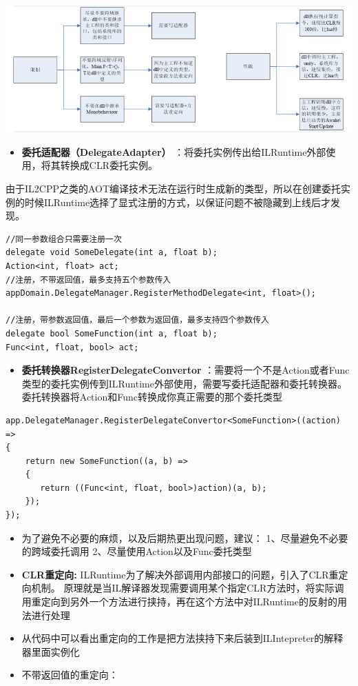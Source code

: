 \documentclass[9pt, b5paper]{article}
\begin{document}
\includegraphics[width=.9\linewidth]{./pic/readme_20220926_095555.png}
\begin{itemize}
\item \textbf{委托适配器（DelegateAdapter）} ：将委托实例传出给ILRuntime外部使用，将其转换成CLR委托实例。
\end{itemize}
由于IL2CPP之类的AOT编译技术无法在运行时生成新的类型，所以在创建委托实例的时候ILRuntime选择了显式注册的方式，以保证问题不被隐藏到上线后才发现。
\begin{verbatim}
//同一参数组合只需要注册一次
delegate void SomeDelegate(int a, float b);
Action<int, float> act;
//注册，不带返回值，最多支持五个参数传入
appDomain.DelegateManager.RegisterMethodDelegate<int, float>();

//注册，带参数返回值，最后一个参数为返回值，最多支持四个参数传入
delegate bool SomeFunction(int a, float b);
Func<int, float, bool> act;
\end{verbatim}
\begin{itemize}
\item \textbf{委托转换器RegisterDelegateConvertor} ：需要将一个不是Action或者Func类型的委托实例传到ILRuntime外部使用，需要写委托适配器和委托转换器。委托转换器将Action和Func转换成你真正需要的那个委托类型
\end{itemize}
\begin{verbatim}
app.DelegateManager.RegisterDelegateConvertor<SomeFunction>((action) =>
{
    return new SomeFunction((a, b) =>
    {
       return ((Func<int, float, bool>)action)(a, b);
    });
});
\end{verbatim}
\begin{itemize}
\item 为了避免不必要的麻烦，以及后期热更出现问题，建议： 1、尽量避免不必要的跨域委托调用 2、尽量使用Action以及Func委托类型
\item \textbf{CLR重定向:} ILRuntime为了解决外部调用内部接口的问题，引入了CLR重定向机制。 原理就是当IL解译器发现需要调用某个指定CLR方法时，将实际调用重定向到另外一个方法进行挟持，再在这个方法中对ILRuntime的反射的用法进行处理
\item 从代码中可以看出重定向的工作是把方法挟持下来后装到ILIntepreter的解释器里面实例化
\item 不带返回值的重定向：
\end{itemize}
\end{document}
